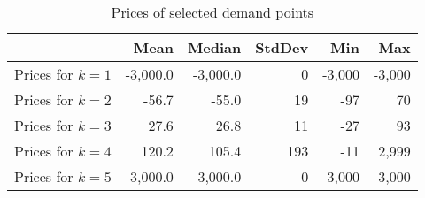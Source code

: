 \begin{table}[H]
\centering
\begin{tabular}{lrrrrr}
 & Mean  & Median  & StdDev  & Min  & Max  \\  \midrule 
Prices for $k=1$ &  -3,000.0 &  -3,000.0 &         0 &    -3,000 &    -3,000 \\  
Prices for $k=2$ &     -56.7 &     -55.0 &        19 &       -97 &        70 \\  
Prices for $k=3$  &      27.6 &      26.8 &        11 &       -27 &        93 \\  
Prices for $k=4$  &     120.2 &     105.4 &       193 &       -11 &     2,999 \\  
Prices for $k=5$ &   3,000.0 &   3,000.0 &         0 &     3,000 &     3,000 \\  
\bottomrule
\end{tabular}
\caption{\label{selectedPricesPurchase} Prices of selected demand points}
\end{table}
